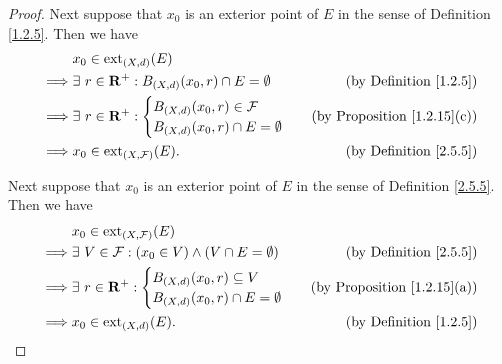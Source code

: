 \begin{proof}
    Next suppose that \(x_0\) is an exterior point of \(E\) in the sense of Definition \ref{1.2.5}.
    Then we have
    \begin{align*}
                 & x_0 \in \text{ext}_{(X, d)}(E)                                                                    \\
        \implies & \exists\ r \in \mathbf{R}^+ : B_{(X, d)}(x_0, r) \cap E = \emptyset & \text{(by Definition \ref{1.2.5})}  \\
        \implies & \exists\ r \in \mathbf{R}^+ : \begin{cases}
                                             B_{(X, d)}(x_0, r) \in \mathcal{F} \\
                                             B_{(X, d)}(x_0, r) \cap E = \emptyset
                                         \end{cases}                       & \text{(by Proposition \ref{1.2.15}(c))} \\
        \implies & x_0 \in \text{ext}_{(X, \mathcal{F})}(E).                   & \text{(by Definition \ref{2.5.5})}
    \end{align*}

    Next suppose that \(x_0\) is an exterior point of \(E\) in the sense of Definition \ref{2.5.5}.
    Then we have
    \begin{align*}
                 & x_0 \in \text{ext}_{(X, \mathcal{F})}(E)                                                                    \\
        \implies & \exists\ V \in \mathcal{F} : (x_0 \in V) \land (V \cap E = \emptyset) & \text{(by Definition \ref{2.5.5})}  \\
        \implies & \exists\ r \in \mathbf{R}^+ : \begin{cases}
                                             B_{(X, d)}(x_0, r) \subseteq V \\
                                             B_{(X, d)}(x_0, r) \cap E = \emptyset
                                         \end{cases}                                 & \text{(by Proposition \ref{1.2.15}(a))} \\
        \implies & x_0 \in \text{ext}_{(X, d)}(E).                                       & \text{(by Definition \ref{1.2.5})}
    \end{align*}


\end{proof}
